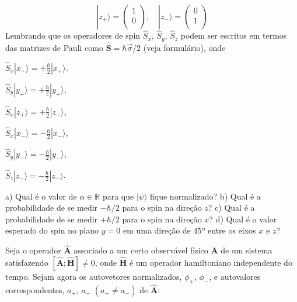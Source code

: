 \begin{enumerate}[start=1,label={\bfseries Q\arabic*.}]
$$
| z_{+} \rangle = \left( \begin{array}{c} 1 \\ 0 \\ \end{array} \right), \quad | z_{-} \rangle = \left( \begin{array}{c} 0 \\ 1 \\ \end{array} \right)
$$
Lembrando que os operadores de spin $\hat{S}_{x}$, $\hat{S}_{y}$, $\hat{S}_{z}$ podem ser escritos em termos das matrizes de Pauli como $\hat{\mathbf{S}} = \hbar \vec{\sigma} / 2 $ (veja formulário), onde



        \begin{minipage}{0.4\linewidth}
        \item[] $\hat{S}_{x}| x_{+} \rangle = + \frac{\hbar}{2} | x_{+} \rangle$,
        \item[] $\hat{S}_{y}| y_{+} \rangle = + \frac{\hbar}{2} | y_{+} \rangle$,
        \item[] $\hat{S}_{x}| z_{+} \rangle = + \frac{\hbar}{2} | z_{+} \rangle$,
        \end{minipage}
        \begin{minipage}{0.4\linewidth}
        \item[] $\hat{S}_{x}| x_{-} \rangle = - \frac{\hbar}{2} | x_{-} \rangle$,
        \item[] $\hat{S}_{y}| y_{-} \rangle = - \frac{\hbar}{2} | y_{-} \rangle$,
        \item[] $\hat{S}_{z}| z_{-} \rangle = - \frac{\hbar}{2} | z_{-} \rangle$.
        \end{minipage}




  a) Qual é o valor de $\alpha \in \mathbb{R}$ para que $| \psi \rangle$ fique normalizado?
  b) Qual é a probabilidade de se medir $-\hbar / 2$ para o spin na direção $z$?
  c) Qual é a probabilidade de se medir $+\hbar / 2$ para o spin na direção $x$?
  d) Qual é o valor esperado do spin no plano $y = 0$ em uma direção de $45º$ entre os eixos $x$ e $z$?




\item Seja o operador $\hat{\mathbf{A}}$ associado a um certo observável físico $\mathbf{A}$ de um sistema satisfazendo $\left[ \hat{\mathbf{A}}; \hat{\mathbf{H}}  \right] \neq 0$, onde $\hat{\mathbf{H}}$ é um operador hamiltoniano independente do tempo. Sejam agora os autovetores normalizados, $\phi_{+}$, $\phi_{-}$, e autovalores correspondentes, $a_{+}$, $a_{-}$ $\left( a_{+} \neq a_{-} \right)$ de $\hat{\mathbf{A}}$:


\end{enumerate}
